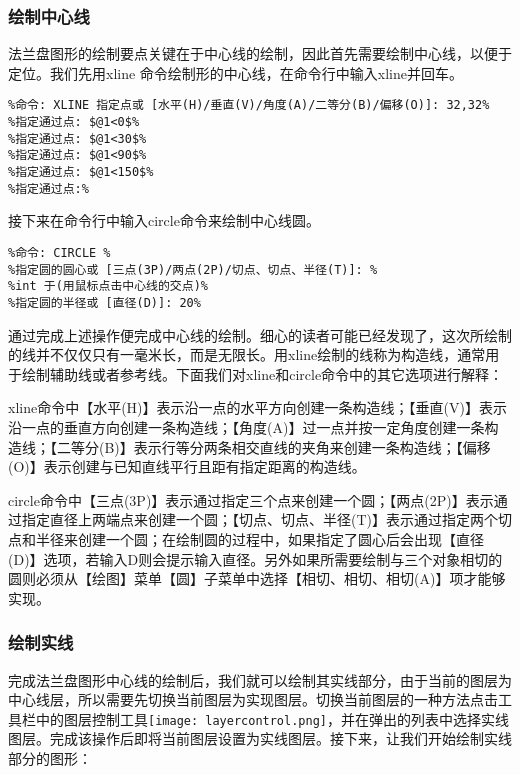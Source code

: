 \subsubsection{绘制中心线}
法兰盘图形的绘制要点关键在于中心线的绘制，因此首先需要绘制中心线，以便于定位。我们先用xline 命令绘制形的中心线，在命令行中输入xline并回车。

\begin{lstlisting}
%命令: XLINE 指定点或 [水平(H)/垂直(V)/角度(A)/二等分(B)/偏移(O)]: 32,32%
%指定通过点: $@1<0$%
%指定通过点: $@1<30$%
%指定通过点: $@1<90$%
%指定通过点: $@1<150$%
%指定通过点:%
\end{lstlisting}

接下来在命令行中输入circle命令来绘制中心线圆。

\begin{lstlisting}
%命令: CIRCLE %
%指定圆的圆心或 [三点(3P)/两点(2P)/切点、切点、半径(T)]: %
%int 于(用鼠标点击中心线的交点)%
%指定圆的半径或 [直径(D)]: 20%
\end{lstlisting}

通过完成上述操作便完成中心线的绘制。细心的读者可能已经发现了，这次所绘制的线并不仅仅只有一毫米长，而是无限长。用xline绘制的线称为构造线，通常用于绘制辅助线或者参考线。下面我们对xline和circle命令中的其它选项进行解释：

xline命令中【水平(H)】表示沿一点的水平方向创建一条构造线；【垂直(V)】表示沿一点的垂直方向创建一条构造线；【角度(A)】过一点并按一定角度创建一条构造线；【二等分(B)】表示行等分两条相交直线的夹角来创建一条构造线；【偏移(O)】表示创建与已知直线平行且距有指定距离的构造线。

circle命令中【三点(3P)】表示通过指定三个点来创建一个圆；【两点(2P)】表示通过指定直径上两端点来创建一个圆；【切点、切点、半径(T)】表示通过指定两个切点和半径来创建一个圆；在绘制圆的过程中，如果指定了圆心后会出现【直径(D)】选项，若输入D则会提示输入直径。另外如果所需要绘制与三个对象相切的圆则必须从【绘图】菜单【圆】子菜单中选择【相切、相切、相切(A)】项才能够实现。
\subsubsection{绘制实线}
完成法兰盘图形中心线的绘制后，我们就可以绘制其实线部分，由于当前的图层为中心线层，所以需要先切换当前图层为实现图层。切换当前图层的一种方法点击工具栏中的图层控制工具\texttt{[image: layercontrol.png]}，并在弹出的列表中选择实线图层。完成该操作后即将当前图层设置为实线图层。接下来，让我们开始绘制实线部分的图形：

